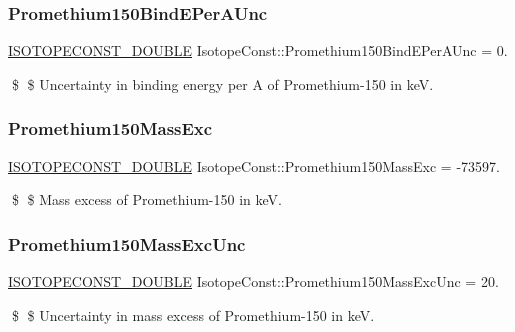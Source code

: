 \subsubsection{\texorpdfstring{Promethium150\+Bind\+E\+Per\+A\+Unc}{Promethium150BindEPerAUnc}}
{\footnotesize\ttfamily \mbox{\hyperlink{group___isotope_const-_macros_ga8f45a7272ce02c0b4c65c44636ed719a}{I\+S\+O\+T\+O\+P\+E\+C\+O\+N\+S\+T\+\_\+\+D\+O\+U\+B\+LE}} Isotope\+Const\+::\+Promethium150\+Bind\+E\+Per\+A\+Unc = 0.}

\$ \$ Uncertainty in binding energy per A of Promethium-\/150 in keV. \mbox{\label{group___isotope_const-_promethium-_pm150_gad1326b44bf02fb159929fb975e2c2fdd}} 
\subsubsection{\texorpdfstring{Promethium150\+Mass\+Exc}{Promethium150MassExc}}
{\footnotesize\ttfamily \mbox{\hyperlink{group___isotope_const-_macros_ga8f45a7272ce02c0b4c65c44636ed719a}{I\+S\+O\+T\+O\+P\+E\+C\+O\+N\+S\+T\+\_\+\+D\+O\+U\+B\+LE}} Isotope\+Const\+::\+Promethium150\+Mass\+Exc = -\/73597.}

\$ \$ Mass excess of Promethium-\/150 in keV. \mbox{\label{group___isotope_const-_promethium-_pm150_ga40edf4d8470b83807b66ebb37bbfb382}} 
\subsubsection{\texorpdfstring{Promethium150\+Mass\+Exc\+Unc}{Promethium150MassExcUnc}}
{\footnotesize\ttfamily \mbox{\hyperlink{group___isotope_const-_macros_ga8f45a7272ce02c0b4c65c44636ed719a}{I\+S\+O\+T\+O\+P\+E\+C\+O\+N\+S\+T\+\_\+\+D\+O\+U\+B\+LE}} Isotope\+Const\+::\+Promethium150\+Mass\+Exc\+Unc = 20.}

\$ \$ Uncertainty in mass excess of Promethium-\/150 in keV. \mbox{\label{group___isotope_const-_promethium-_pm150_ga4273f8229acd8388783606124ed36368}} 
